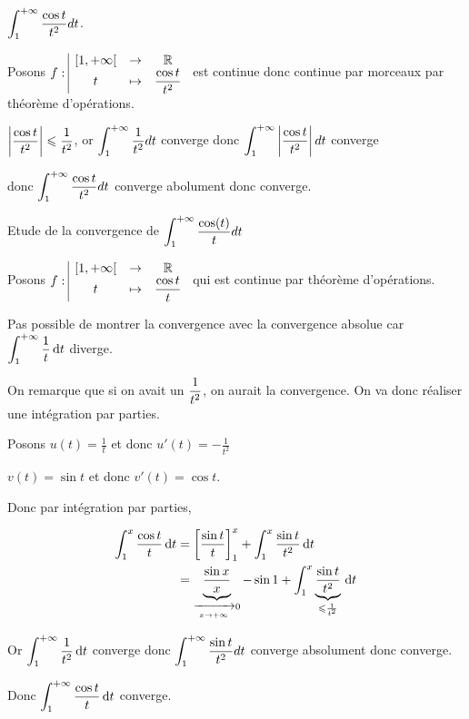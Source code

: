 \begin{exemple}
    $\displaystyle \int_1^{+ \infty} \frac{\cos t}{t^2} dt$. 

    Posons $f: \space \begin{array}{|ccc} \displaystyle [1, + \infty[ & \to & \displaystyle \mathbb{R} \\ \displaystyle t & \mapsto & \displaystyle \frac{\cos t}{t^2} \end{array}$ est continue donc continue par 
    morceaux par théorème d'opérations. 

    $ \displaystyle \left| \frac{\cos t}{t^2} \right| \leqslant \frac{1}{t^2}$, or $\displaystyle \int_1^{+ \infty} \frac{1}{t^2} dt$ converge donc
    $\displaystyle \int_1^{+ \infty} \left| \frac{\cos t}{t^2} \right| dt$ converge
    
    donc $\displaystyle \int_1^{+ \infty} \frac{\cos t}{t^2} dt$ converge abolument donc converge. 
\end{exemple}

\begin{exemple}
    Etude de la convergence de $\displaystyle \int_1^{+ \infty} \frac{\cos(t)}{t} dt$

    Posons $f: \space \begin{array}{|ccc} \displaystyle [1, + \infty[ & \to & \displaystyle \mathbb{R} \\ \displaystyle t & \mapsto & \displaystyle \frac{\cos t}{t} \end{array}$ qui est continue par théorème d'opérations.

    Pas possible de montrer la convergence avec la convergence absolue car $\displaystyle \int_1^{+ \infty} \frac{1}{t} \,\mathrm{d}t$ diverge.

    On remarque que si on avait un $\displaystyle \frac 1 {t^2}$, on aurait la convergence. On va donc 
    réaliser une intégration par parties.

    Posons $u(t) = \frac 1 t$ et donc $u'(t) = - \frac 1 {t^2}$ 

    $v(t) = \sin t$ et donc $v'(t) = \cos t$.

    Donc par intégration par parties, 

    \begin{align}
        \int_1^x \frac{\cos t}{t} \,\mathrm{d}t &= \left[ \frac{\sin t}{t} \right]_1^x + \int_1^x \frac{\sin t}{t^2} \,\mathrm{d}t \\
        &= \underbrace{\frac{\sin x}{x}}_{\xrightarrow[x \to + \infty   ]{} 0} - \sin 1 + \int_1^x \underbrace{\frac{\sin t}{t^2}}_{\leqslant \frac 1 {t^2}} \,\mathrm{d}t
    \end{align}

    Or $\displaystyle \int_1^{+ \infty} \frac{1}{t^2} \,\mathrm{d}t$ converge donc $\displaystyle \int_1^{+ \infty} \frac{\sin t}{t^2} dt$ converge absolument donc converge.

    Donc $\displaystyle \int_1^{+ \infty} \frac{\cos t}{t} \,\mathrm{d}t$ converge.
\end{exemple}

